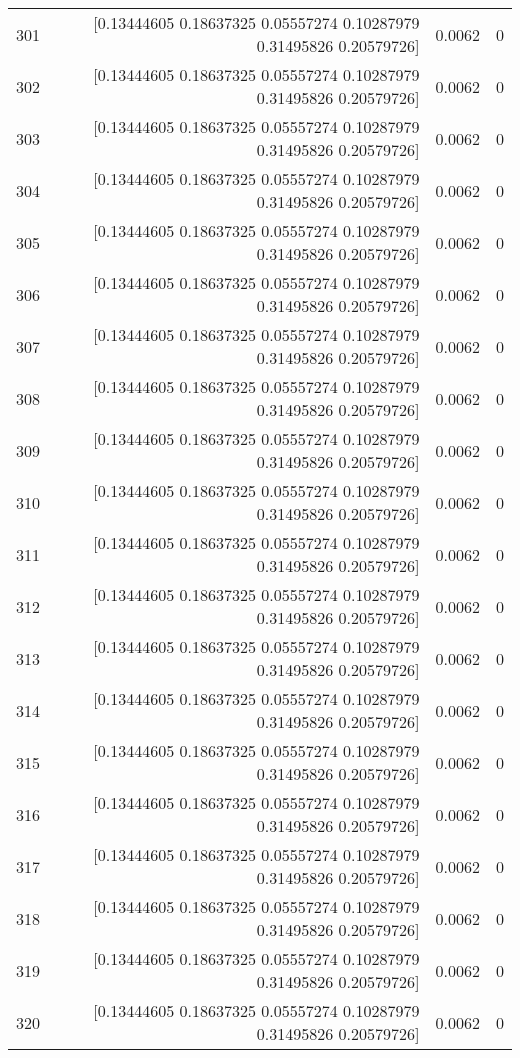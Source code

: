 \begin{longtable}{lrrr}
301 & [0.13444605 0.18637325 0.05557274 0.10287979 0.31495826 0.20579726] & 0.0062 & 0 \\
302 & [0.13444605 0.18637325 0.05557274 0.10287979 0.31495826 0.20579726] & 0.0062 & 0 \\
303 & [0.13444605 0.18637325 0.05557274 0.10287979 0.31495826 0.20579726] & 0.0062 & 0 \\
304 & [0.13444605 0.18637325 0.05557274 0.10287979 0.31495826 0.20579726] & 0.0062 & 0 \\
305 & [0.13444605 0.18637325 0.05557274 0.10287979 0.31495826 0.20579726] & 0.0062 & 0 \\
306 & [0.13444605 0.18637325 0.05557274 0.10287979 0.31495826 0.20579726] & 0.0062 & 0 \\
307 & [0.13444605 0.18637325 0.05557274 0.10287979 0.31495826 0.20579726] & 0.0062 & 0 \\
308 & [0.13444605 0.18637325 0.05557274 0.10287979 0.31495826 0.20579726] & 0.0062 & 0 \\
309 & [0.13444605 0.18637325 0.05557274 0.10287979 0.31495826 0.20579726] & 0.0062 & 0 \\
310 & [0.13444605 0.18637325 0.05557274 0.10287979 0.31495826 0.20579726] & 0.0062 & 0 \\
311 & [0.13444605 0.18637325 0.05557274 0.10287979 0.31495826 0.20579726] & 0.0062 & 0 \\
312 & [0.13444605 0.18637325 0.05557274 0.10287979 0.31495826 0.20579726] & 0.0062 & 0 \\
313 & [0.13444605 0.18637325 0.05557274 0.10287979 0.31495826 0.20579726] & 0.0062 & 0 \\
314 & [0.13444605 0.18637325 0.05557274 0.10287979 0.31495826 0.20579726] & 0.0062 & 0 \\
315 & [0.13444605 0.18637325 0.05557274 0.10287979 0.31495826 0.20579726] & 0.0062 & 0 \\
316 & [0.13444605 0.18637325 0.05557274 0.10287979 0.31495826 0.20579726] & 0.0062 & 0 \\
317 & [0.13444605 0.18637325 0.05557274 0.10287979 0.31495826 0.20579726] & 0.0062 & 0 \\
318 & [0.13444605 0.18637325 0.05557274 0.10287979 0.31495826 0.20579726] & 0.0062 & 0 \\
319 & [0.13444605 0.18637325 0.05557274 0.10287979 0.31495826 0.20579726] & 0.0062 & 0 \\
320 & [0.13444605 0.18637325 0.05557274 0.10287979 0.31495826 0.20579726] & 0.0062 & 0 \\

\end{longtable}
